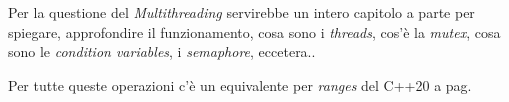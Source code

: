 \textsf{\small Per la questione del \emph{Multithreading} servirebbe un intero capitolo a parte per spiegare, approfondire il funzionamento, cosa sono i \emph{threads}, cos'è la \emph{mutex}, cosa sono le \emph{condition variables}, i \emph{semaphore}, eccetera..} \\


\fleuron

\textsf{\small Per tutte queste operazioni c'è un equivalente per \emph{ranges} del C++20 a pag. \pageref{ranges}} \\


\label{ranges}

